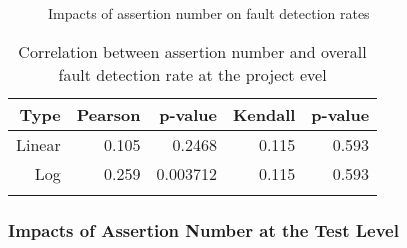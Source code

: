 \begin{comment}
\begin{figure}[t]
\center
\texttt{[image: plots/killed\_assertion]}
\caption{\label{fig:killed_project}Killed Mutants and Assertions of Project}
\end{figure}
\end{comment}

\begin{figure*}[t]
\center
{}
\caption{Impacts of assertion number on fault detection rates}
\end{figure*}

\begin{table}[!t]
\renewcommand{\arraystretch}{1.3}
\tiny
\caption{Correlation between assertion number and overall fault detection rate at the project evel}
\label{table:t_cor_ass_ratio}
\centering
\begin{tabular}
{rrrrr}
\Xhline{2\arrayrulewidth}
Type & Pearson & p-value & Kendall & p-value\\
\hline
Linear & 0.105 & 0.2468 & 0.115 & 0.593\\
Log & 0.259 & 0.003712 & 0.115 & 0.593\\
\Xhline{2\arrayrulewidth}
\end{tabular}
\end{table}


\begin{comment}
\begin{figure}[t]
\center
\texttt{[image: plots/killed\_assertion\_test]}
\caption{\label{fig:killed_assertion_test}Killed Mutants and Assertions of Test}
\end{figure}
\end{comment}

\subsubsection{Impacts of Assertion Number at the Test Level}


